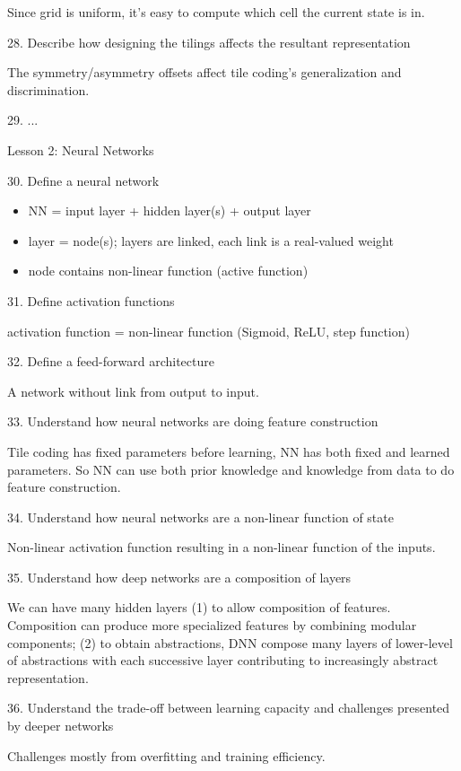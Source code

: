\documentclass[sutton_barto_notes.tex]{subfiles}
\begin{document}
Since grid is uniform, it's easy to compute which cell the current state is in.

28. Describe how designing the tilings affects the resultant representation 

The symmetry/asymmetry offsets affect tile coding's generalization and discrimination.

29. ...

Lesson 2: Neural Networks 

30. Define a neural network

\begin{itemize}
\item NN = input layer + hidden layer(s) + output layer
\item layer = node(s); layers are linked, each link is a real-valued weight
\item node contains non-linear function (active function)
\end{itemize}

31. Define activation functions

activation function = non-linear function (Sigmoid, ReLU, step function)

32. Define a feed-forward architecture 

A network without link from output to input.

33. Understand how neural networks are doing feature construction 

Tile coding has fixed parameters before learning, NN has both fixed and learned parameters. So NN can use both prior knowledge and knowledge from data to do feature construction.

34. Understand how neural networks are a non-linear function of state 

Non-linear activation function resulting in a non-linear function of the inputs.

35. Understand how deep networks are a composition of layers 

We can have many hidden layers (1) to allow composition of features. Composition can produce more specialized features by combining modular components; (2) to obtain abstractions, DNN compose many layers of lower-level of abstractions with each successive layer contributing to increasingly abstract representation.

36. Understand the trade-off between learning capacity and challenges presented by deeper networks 

Challenges mostly from overfitting and training efficiency.
\end{document}
